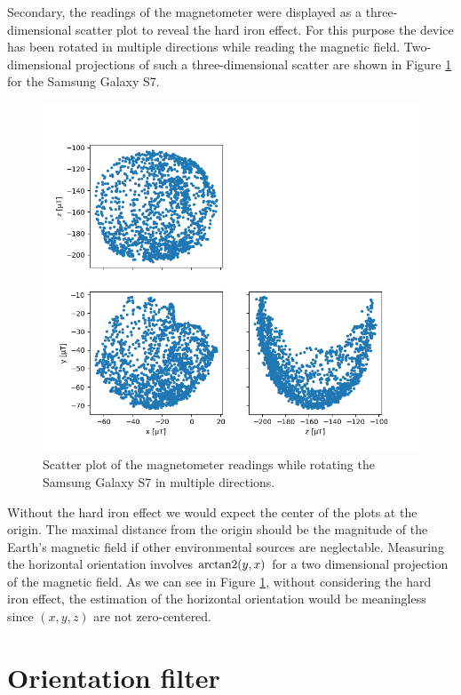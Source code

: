 Secondary, the readings of the magnetometer were displayed as a three-dimensional scatter plot to reveal the hard iron effect. For this purpose the device has been rotated in multiple directions while reading the magnetic field. Two-dimensional projections of such a three-dimensional scatter are shown in Figure \ref{fig:scatter} for the Samsung Galaxy S7.

\begin{figure}[hbt!]
    \centering
    \includegraphics[width=1.0\textwidth]{figures/scatter_s7.png}
    \caption{Scatter plot of the magnetometer readings while rotating the Samsung Galaxy S7 in multiple directions.}
    \label{fig:scatter}
\end{figure}

Without the hard iron effect we would expect the center of the plots at the origin. The maximal distance from the origin should be the magnitude of the Earth's magnetic field if other environmental sources are neglectable. Measuring the horizontal orientation involves $\operatorname{arctan2}(y, x)$ for a two dimensional projection of the magnetic field. As we can see in Figure \ref{fig:scatter}, without considering the hard iron effect, the estimation of the horizontal orientation would be meaningless since $(x, y, z)$ are not zero-centered.

\section{Orientation filter}

